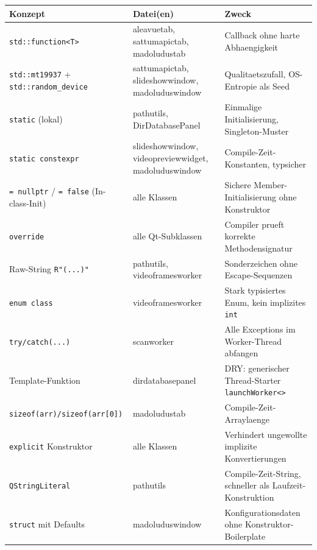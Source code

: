 \begin{longtable}{p{4.2cm}p{4.2cm}p{5cm}}
\toprule
\textbf{Konzept} & \textbf{Datei(en)} & \textbf{Zweck} \\
\midrule
\endfirsthead
\midrule
\endhead
\verb|std::function<T>| &
  aleavuetab, sattumapictab, madoludustab &
  Callback ohne harte Abhaengigkeit \\[4pt]

\verb|std::mt19937| + \verb|std::random_device| &
  sattumapictab, slideshowwindow, madoluduswindow &
  Qualitaetszufall, OS-Entropie als Seed \\[4pt]

\verb|static| (lokal) &
  pathutils, DirDatabasePanel &
  Einmalige Initialisierung, Singleton-Muster \\[4pt]

\verb|static constexpr| &
  slideshowwindow, videopreviewwidget, madoluduswindow &
  Compile-Zeit-Konstanten, typsicher \\[4pt]

\verb|= nullptr| / \verb|= false| (In-class-Init) &
  alle Klassen &
  Sichere Member-Initialisierung ohne Konstruktor \\[4pt]

\verb|override| &
  alle Qt-Subklassen &
  Compiler prueft korrekte Methodensignatur \\[4pt]

Raw-String \verb|R"(...)"| &
  pathutils, videoframesworker &
  Sonderzeichen ohne Escape-Sequenzen \\[4pt]

\verb|enum class| &
  videoframesworker &
  Stark typisiertes Enum, kein implizites \verb|int| \\[4pt]

\verb|try/catch(...)| &
  scanworker &
  Alle Exceptions im Worker-Thread abfangen \\[4pt]

Template-Funktion &
  dirdatabasepanel &
  DRY: generischer Thread-Starter \verb|launchWorker<>| \\[4pt]

\verb|sizeof(arr)/sizeof(arr[0])| &
  madoludustab &
  Compile-Zeit-Arraylaenge \\[4pt]

\verb|explicit| Konstruktor &
  alle Klassen &
  Verhindert ungewollte implizite Konvertierungen \\[4pt]

\verb|QStringLiteral| &
  pathutils &
  Compile-Zeit-String, schneller als Laufzeit-Konstruktion \\[4pt]

\verb|struct| mit Defaults &
  madoluduswindow &
  Konfigurationsdaten ohne Konstruktor-Boilerplate \\[4pt]

\bottomrule
\end{longtable}

